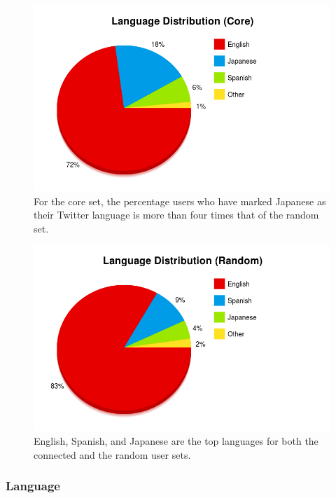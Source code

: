\begin{figure}[h]
 \centering
 \includegraphics[bb=0 0 800 500,scale=.2]{./images/lang-core.png}
 \caption{For the core set, the percentage users who have marked Japanese as their Twitter language is more than four times that of the random set.}
\label{fig:lang-core}
\end{figure}

\begin{figure}[h]
 \centering
 \includegraphics[bb=0 0 800 500,scale=.2]{./images/lang-rand.png}
 \caption{English, Spanish, and Japanese are the top languages for both the connected and the random user sets.}
\label{fig:lang-rand}
\end{figure}

\subsubsection{Language}

